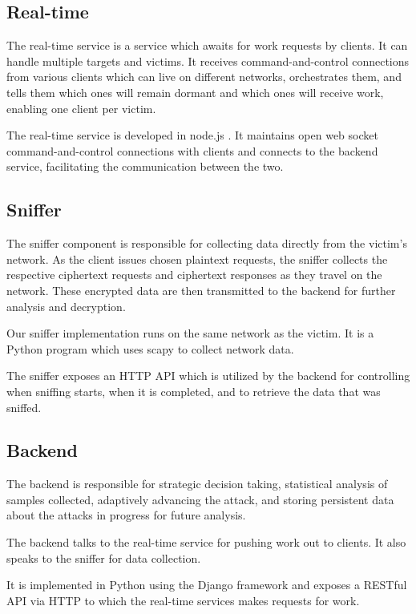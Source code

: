 \documentclass[a4paper, 11 pt, conference]{article}  %
\begin{document}
\subsection{Real-time}

The real-time service is a service which awaits for work requests by clients. It
can handle multiple targets and victims. It receives command-and-control
connections from various clients which can live on different networks,
orchestrates them, and tells them which ones will remain dormant and which ones
will receive work, enabling one client per victim.

The real-time service is developed in node.js \cite{c11}. It maintains open web
socket command-and-control connections with clients and connects to the backend
service, facilitating the communication between the two.

\subsection{Sniffer}

The sniffer component is responsible for collecting data directly from the
victim's network. As the client issues chosen plaintext requests, the sniffer
collects the respective ciphertext requests and ciphertext responses as they
travel on the network. These encrypted data are then transmitted to the backend
for further analysis and decryption.

Our sniffer implementation runs on the same network as the victim. It is a
Python program which uses scapy \cite{c12} to collect network data.

The sniffer exposes an HTTP API which is utilized by the backend for controlling
when sniffing starts, when it is completed, and to retrieve the data that was
sniffed.

\subsection{Backend}

The backend is responsible for strategic decision taking, statistical analysis
of samples collected, adaptively advancing the attack, and storing persistent
data about the attacks in progress for future analysis.

The backend talks to the real-time service for pushing work out to clients. It
also speaks to the sniffer for data collection.

It is implemented in Python using the Django framework \cite{c13} and exposes a
RESTful API via HTTP to which the real-time services makes requests for work.
\end{document}
